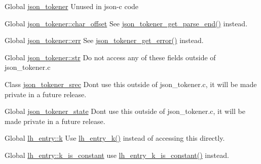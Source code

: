 \begin{DoxyRefList}
\item[Global \mbox{\hyperlink{json__tokener_8h_a4dd5e5b65aee7f376f529f86b210ff49}{json\+\_\+tokener}} ]\label{deprecated__deprecated000004}%
%
Unused in json-\/c code  
\item[Global \mbox{\hyperlink{structjson__tokener_abd4beb1a53e0d77185af96d9a96fc229}{json\+\_\+tokener\+::char\+\_\+offset}} ]\label{deprecated__deprecated000006}%
%
See \mbox{\hyperlink{json__tokener_8h_a4a2fa28d815f8b370cbb00b80ebc0f1d}{json\+\_\+tokener\+\_\+get\+\_\+parse\+\_\+end()}} instead.  
\item[Global \mbox{\hyperlink{structjson__tokener_a4ee4b1b9de3afc824c7837e0c6fc35ee}{json\+\_\+tokener\+::err}} ]\label{deprecated__deprecated000007}%
%
See \mbox{\hyperlink{json__tokener_8h_af5d7ffd95a0f6e5d5bb5994d233b4197}{json\+\_\+tokener\+\_\+get\+\_\+error()}} instead.  
\item[Global \mbox{\hyperlink{structjson__tokener_ab50d783982593ef993ea0b68f7ad8b80}{json\+\_\+tokener\+::str}} ]\label{deprecated__deprecated000005}%
%
Do not access any of these fields outside of json\+\_\+tokener.\+c  
\item[Class \mbox{\hyperlink{structjson__tokener__srec}{json\+\_\+tokener\+\_\+srec}} ]\label{deprecated__deprecated000003}%
%
Don\textquotesingle{}t use this outside of json\+\_\+tokener.\+c, it will be made private in a future release.  
\item[Global \mbox{\hyperlink{json__tokener_8h_af026dec71e4548e6200eb2f902f1c4e2}{json\+\_\+tokener\+\_\+state}} ]\label{deprecated__deprecated000002}%
%
Don\textquotesingle{}t use this outside of json\+\_\+tokener.\+c, it will be made private in a future release.  
\item[Global \mbox{\hyperlink{structlh__entry_ab8d4141ae4531e16eb70582bf486c939}{lh\+\_\+entry\+::k}} ]\label{deprecated__deprecated000011}%
%
Use \mbox{\hyperlink{linkhash_8h_a796b9c1ceccb8594a7300ca69b916675}{lh\+\_\+entry\+\_\+k()}} instead of accessing this directly.  
\item[Global \mbox{\hyperlink{structlh__entry_ae8eab92d9da2ff70a9372fd1936f66af}{lh\+\_\+entry\+::k\+\_\+is\+\_\+constant}} ]\label{deprecated__deprecated000012}%
%
use \mbox{\hyperlink{linkhash_8h_a7bd3963705dae5e401aa89ed945fabde}{lh\+\_\+entry\+\_\+k\+\_\+is\+\_\+constant()}} instead.  

\end{DoxyRefList}
